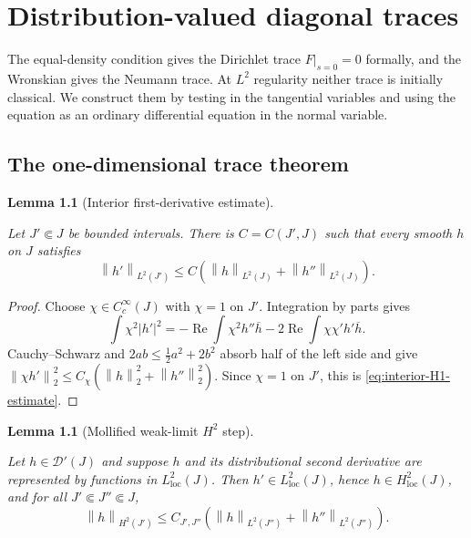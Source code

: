 \documentclass[11pt,oneside]{book}
\providecommand{\uses}[1]{}
\newtheorem{lemma}[theorem]{Lemma}
\theoremstyle{definition}
\theoremstyle{remark}
\newcommand{\D}{\mathcal D}
\newcommand{\1}{\mathbf 1}
\newcommand{\loc}{\mathrm{loc}}
\newcommand{\Rea}{\operatorname{Re}}
\newcommand{\norm}[1]{\left\lVert #1\right\rVert}
\newcommand{\abs}[1]{\left\lvert #1\right\rvert}
\begin{document}
\chapter{Distribution-valued diagonal traces}\label{chap:traces}

The equal-density condition gives the Dirichlet trace $F|_{s=0}=0$ formally, and
the Wronskian gives the Neumann trace. At $L^2$ regularity neither trace is
initially classical. We construct them by testing in the tangential variables and
using the equation as an ordinary differential equation in the normal variable.

\section{The one-dimensional trace theorem}

\begin{lemma}[Interior first-derivative estimate]\label{lem:interior-first-derivative}
\uses{def:Hs-space}
Let $J'\Subset J$ be bounded intervals. There is $C=C(J',J)$ such that every
smooth $h$ on $J$ satisfies
\begin{equation}
 \norm{h'}_{L^2(J')}\le C\left(\norm h_{L^2(J)}+\norm{h''}_{L^2(J)}\right).
 \label{eq:interior-H1-estimate}
\end{equation}
\end{lemma}

\begin{proof}
Choose $\chi\in C_c^\infty(J)$ with $\chi=1$ on $J'$. Integration by parts gives
\[
 \int\chi^2\abs{h'}^2
 =-\Rea\int\chi^2h''\overline h-2\Rea\int\chi\chi'h'\overline h.
\]
Cauchy--Schwarz and $2ab\le\tfrac12a^2+2b^2$ absorb half of the left side and
give $\norm{\chi h'}_2^2\le C_\chi(\norm h_2^2+\norm{h''}_2^2)$. Since $\chi=1$ on
$J'$, this is \eqref{eq:interior-H1-estimate}.
\end{proof}

\begin{lemma}[Mollified weak-limit $H^2$ step]\label{lem:H2-weak-limit}
\uses{lem:interior-first-derivative}
Let $h\in\D'(J)$ and suppose $h$ and its distributional second derivative are
represented by functions in $L^2_{\loc}(J)$. Then $h'\in L^2_{\loc}(J)$, hence
$h\in H^2_{\loc}(J)$, and for all $J'\Subset J''\Subset J$,
\begin{equation}
 \norm h_{H^2(J')}\le C_{J',J''}\left(\norm h_{L^2(J'')}+\norm{h''}_{L^2(J'')}\right).
 \label{eq:local-H2-bound}
\end{equation}
\end{lemma}
\end{document}
